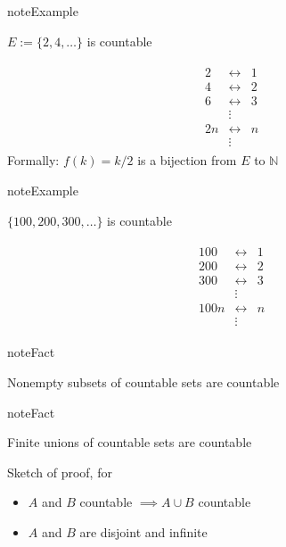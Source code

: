 \documentclass[letterpaper,10pt,english]{jupyterBook}
\begin{document}
\begin{sphinxadmonition}{note}{Example}

\sphinxAtStartPar
\(E := \{2, 4, \ldots\}\) is countable
\end{sphinxadmonition}
\begin{equation*}
\begin{split}
\begin{array}{ccc}
2 & \leftrightarrow & 1 \\
4 & \leftrightarrow & 2 \\
6 & \leftrightarrow & 3 \\
& \vdots &  \\
2n & \leftrightarrow & n \\
& \vdots &  
\end{array}
\end{split}
\end{equation*}
\sphinxAtStartPar
Formally: \(f(k) = k/2\) is a bijection from \(E\) to \(\mathbb{N}\)

\begin{sphinxadmonition}{note}{Example}

\sphinxAtStartPar
\(\{100, 200, 300, \ldots\}\) is countable
\end{sphinxadmonition}
\begin{equation*}
\begin{split}
\begin{array}{ccc}
100 & \leftrightarrow & 1 \\
200 & \leftrightarrow & 2 \\
300 & \leftrightarrow & 3 \\
& \vdots &  \\
100n & \leftrightarrow & n \\
& \vdots &  
\end{array}
\end{split}
\end{equation*}
\begin{sphinxadmonition}{note}{Fact}

\sphinxAtStartPar
Nonempty subsets of countable sets are countable
\end{sphinxadmonition}

\begin{sphinxadmonition}{note}{Fact}

\sphinxAtStartPar
Finite unions of countable sets are countable
\end{sphinxadmonition}

\sphinxAtStartPar
Sketch of proof, for
\begin{itemize}
\item {} 
\sphinxAtStartPar
\(A\) and \(B\) countable \(\implies A \cup B\) countable

\item {} 
\sphinxAtStartPar
\(A\) and \(B\) are disjoint and infinite

\end{itemize}
\end{document}
